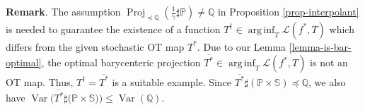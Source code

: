 \documentclass{article} %
\DeclareMathOperator*{\arginf}{arg\,inf}
\DeclareMathOperator{\Var}{Var}
\DeclareMathOperator{\Proj}{Proj}
\begin{document}
\textbf{Remark}. The assumption $\Proj_{\preceq\mathbb{Q}}(\frac{1}{\gamma}\sharp\mathbb{P})\neq \mathbb{Q}$ in Proposition \ref{prop-interpolant} is needed to guarantee the existence of a function $T^{\dagger}\in \arginf_{T}\mathcal{L}(f^{*},T)$ which differs from the given stochastic OT map $T^{*}$. Due to our Lemma \ref{lemma-is-bar-optimal}, the optimal barycenteric projection $\overline{T^{*}}\in \arginf_{T}\mathcal{L}(f^{*},T)$ is not an OT map. Thus, $T^{\dagger}=\overline{T^{*}}$ is a suitable example. Since $\overline{T^{*}}\sharp(\mathbb{P}\!\times\!\mathbb{S})\preceq \mathbb{Q}$, we also have $\Var\big(\overline{T^{*}}\sharp(\mathbb{P}\!\times\mathbb{S}\big)\big)\leq \Var(\mathbb{Q})$.

\end{document}
